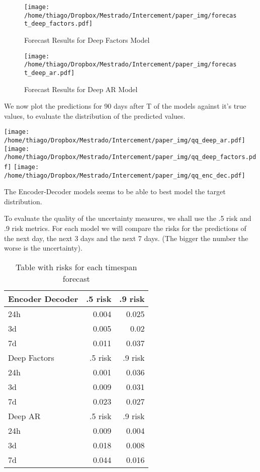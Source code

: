 \documentclass[11pt]{article}
\begin{document}
\begin{figure}[H]
\centering
\texttt{[image: /home/thiago/Dropbox/Mestrado/Intercement/paper\_img/forecast\_deep\_factors.pdf]}
\caption{\label{fig:orga54d6af}
Forecast Results for Deep Factors Model}
\end{figure} 

\begin{figure}[htbp]
\centering
\texttt{[image: /home/thiago/Dropbox/Mestrado/Intercement/paper\_img/forecast\_deep\_ar.pdf]}
\caption{\label{fig:org777ba97}
Forecast Results for Deep AR Model}
\end{figure} 

We now plot the predictions for 90 days after T of the models against it's true values, to evaluate the distribution of the predicted values.

\begin{center}
\texttt{[image: /home/thiago/Dropbox/Mestrado/Intercement/paper\_img/qq\_deep\_ar.pdf]} 
\texttt{[image: /home/thiago/Dropbox/Mestrado/Intercement/paper\_img/qq\_deep\_factors.pdf]} 
\texttt{[image: /home/thiago/Dropbox/Mestrado/Intercement/paper\_img/qq\_enc\_dec.pdf]} 
\end{center}

The Encoder-Decoder models seems to be able to best model the target distribution.

To evaluate the quality of the uncertainty measures, we shall use the .5 risk and .9 risk metrics. For each model 
we will compare the risks for the predictions of the next day, the next 3 days and the next 7 days. (The bigger the number the worse is the uncertainty).

\begin{center}
\begin{table}[htbp]
\caption{\label{tab:org7c01f24}
Table with risks for each timespan forecast}
\centering
\begin{tabular}{lrr}
\hline
Encoder Decoder & .5 risk & .9 risk\\
\hline
24h & 0.004 & 0.025\\
3d & 0.005 & 0.02\\
7d & 0.011 & 0.037\\
\hline
Deep Factors & .5 risk & .9 risk\\
\hline
24h & 0.001 & 0.036\\
3d & 0.009 & 0.031\\
7d & 0.023 & 0.027\\
\hline
Deep AR & .5 risk & .9 risk\\
\hline
24h & 0.009 & 0.004\\
3d & 0.018 & 0.008\\
7d & 0.044 & 0.016\\
\hline
\end{tabular}
\end{table}
\end{center}
\end{document}
